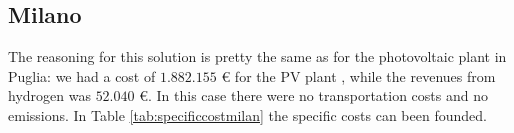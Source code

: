 

\subsection{Milano}
The reasoning for this solution is pretty the same as for the photovoltaic plant in Puglia: we had a cost of $1.882.155$ € for the PV plant , while the revenues from hydrogen was $52.040$ €. In this case there were no transportation costs and no emissions. In Table \ref{tab:specificcostmilan} the specific costs can been founded.

